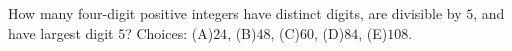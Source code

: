 How many four-digit positive integers have distinct digits, are divisible by $5$, and have largest digit $5$? Choices: (A)$24$, (B)$48$, (C)$60$, (D)$84$, (E)$108$.
